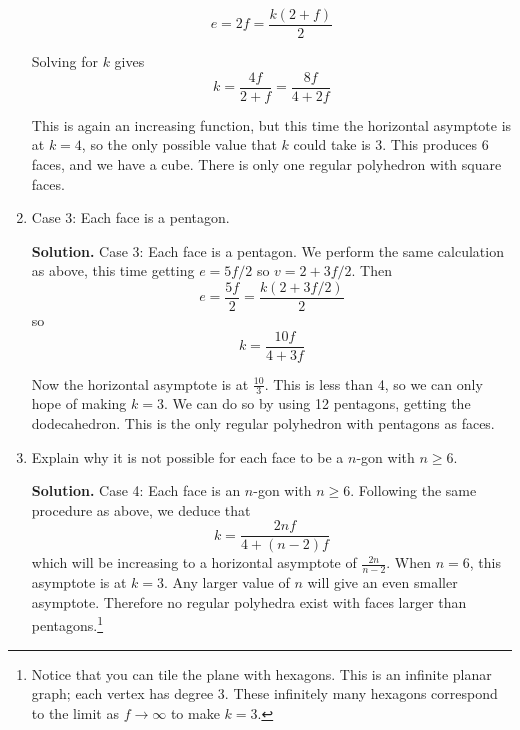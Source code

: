 \documentclass{book}
\begin{document}
\begin{activity}[]
\begin{enumerate}[font=\bfseries,label=(\alph*),ref=\alph*]
\begin{equation*}
e = 2f = \frac{k(2+f)}{2}
\end{equation*}
%
\par
\hypertarget{p-340}{}%
Solving for \(k\) gives%
\begin{equation*}
k = \frac{4f}{2+f} = \frac{8f}{4+2f}
\end{equation*}
%
\par
\hypertarget{p-341}{}%
This is again an increasing function, but this time the horizontal asymptote is at \(k = 4\), so the only possible value that \(k\) could take is 3. This produces 6 faces, and we have a cube. There is only one regular polyhedron with square faces.%
\item\label{task-48} \hypertarget{p-342}{}%
Case 3: Each face is a pentagon.%
\par\smallskip%
\noindent\textbf{Solution.}\hypertarget{solution-31}{}\quad%
\hypertarget{p-343}{}%
Case 3: Each face is a pentagon. We perform the same calculation as above, this time getting \(e = 5f/2\) so \(v = 2 + 3f/2\). Then%
\begin{equation*}
e = \frac{5f}{2} = \frac{k(2+3f/2)}{2}
\end{equation*}
so%
\begin{equation*}
k = \frac{10f}{4+3f}
\end{equation*}
%
\par
\hypertarget{p-344}{}%
Now the horizontal asymptote is at \(\frac{10}{3}\). This is less than 4, so we can only hope of making \(k = 3\). We can do so by using 12 pentagons, getting the dodecahedron. This is the only regular polyhedron with pentagons as faces.%
\item\label{task-49} \hypertarget{p-345}{}%
Explain why it is not possible for each face to be a \(n\)-gon with \(n \ge 6\).%
\par\smallskip%
\noindent\textbf{Solution.}\hypertarget{solution-32}{}\quad%
\hypertarget{p-346}{}%
Case 4: Each face is an \(n\)-gon with \(n \ge 6\). Following the same procedure as above, we deduce that%
\begin{equation*}
k = \frac{2nf}{4+(n-2)f}
\end{equation*}
which will be increasing to a horizontal asymptote of \(\frac{2n}{n-2}\). When \(n = 6\), this asymptote is at \(k = 3\). Any larger value of \(n\) will give an even smaller asymptote. Therefore no regular polyhedra exist with faces larger than pentagons.\footnote{Notice that you can tile the plane with hexagons.  This is an infinite planar graph; each vertex has degree 3.  These infinitely many hexagons correspond to the limit as \(f \to \infty\) to make \(k = 3\).\label{fn-4}}%
\end{enumerate}
\end{activity}

\clearpage
\end{document}
